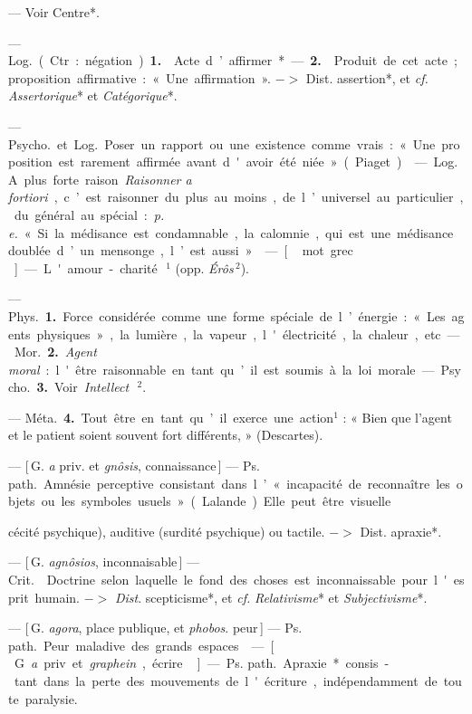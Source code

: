 \begin{itemize}[leftmargin=1cm, label=, itemsep=1pt]
 — Voir Centre*.

 — \si{Log.} (Ctr. : négation).
 {\bf 1.}  Acte d’affirmer*. — {\bf 2.}  Produit de cet acte ;
proposition affirmative : « Une affirmation ».
$->$ Dist. assertion*, et {\it cf.}  {\it Assertorique}* et {\it Catégorique}*.

 — \si{Psycho.} et \si{Log.} Poser
un rapport ou une existence comme
vrais : « Une proposition est rarement
affirmée avant d'avoir été niée »
(Piaget).

 — \si{Log.} A plus forte raison.
{\it Raisonner a fortiori}, c’est raisonner
du plus au moins, de l’universel au
particulier, du général au spécial :
{\it p. e.} « Si la médisance est condamnable,
 la calomnie, qui est une médisance
doublée d’un mensonge, l’est aussi ».

 — [\,mot grec\,] — L'amour-charité\,$^1$
(opp. {\it Érôs}\,$^2$).

 — \si{Phys.} {\bf 1.} Force considérée
comme une forme spéciale de l’énergie : « Les agents physiques », la
lumière, la vapeur, l'électricité, la
chaleur, etc.

— \si{Mor.} {\bf 2.} {\it Agent moral} : l'être
raisonnable en tant qu’il est soumis
à la loi morale.

— \si{Psycho.} {\bf 3.} Voir {\it Intellect}\,$^2$.

— \si{Méta.} {\bf 4.} Tout être en tant
qu’il exerce une action$^1$ : « Bien
que l'agent et le patient soient souvent fort différents, » (Descartes).

 — [\,G. {\it a} priv. et {\it gnôsis}, connaissance\,] — \si{Ps. path.} Amnésie
perceptive consistant dans l’ « incapacité de reconnaître les objets ou les
symboles usuels » (Lalande). Elle
peut être visuelle {cécité psychique),
auditive (surdité psychique) ou tactile. $->$ Dist. apraxie*.

 — [\,G. {\it agnôsios}, inconnaisable\,]
— \si{Crit.}  Doctrine selon
laquelle le fond des choses est
inconnaissable pour l'esprit humain.
$->$ {\it Dist}. scepticisme*, et {\it cf.}  {\it Relativisme}* et {\it Subjectivisme}*.

 — [\,G. {\it agora}, place publique,
et {\it phobos}. peur\,] — \si{Ps. path.} Peur
maladive des grands espaces.

 — [\,G. {\it a} priv. et {\it graphein},
écrire\,] — \si{Ps. path.} Apraxie* consis-
tant dans la perte des mouvements
de l'écriture, indépendamment de
toute paralysie.

}
\end{itemize}
